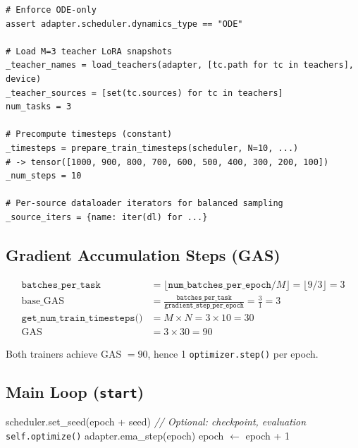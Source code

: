 \documentclass[11pt]{article}
\begin{document}
\begin{lstlisting}
# Enforce ODE-only
assert adapter.scheduler.dynamics_type == "ODE"

# Load M=3 teacher LoRA snapshots
_teacher_names = load_teachers(adapter, [tc.path for tc in teachers], device)
_teacher_sources = [set(tc.sources) for tc in teachers]
num_tasks = 3

# Precompute timesteps (constant)
_timesteps = prepare_train_timesteps(scheduler, N=10, ...)
# -> tensor([1000, 900, 800, 700, 600, 500, 400, 300, 200, 100])
_num_steps = 10

# Per-source dataloader iterators for balanced sampling
_source_iters = {name: iter(dl) for ...}
\end{lstlisting}

\subsection{Gradient Accumulation Steps (GAS)}

\begin{align}
\texttt{batches\_per\_task} &= \lfloor \texttt{num\_batches\_per\_epoch} / M \rfloor = \lfloor 9/3 \rfloor = 3 \\[6pt]
\text{base\_GAS} &= \frac{\texttt{batches\_per\_task}}{\texttt{gradient\_step\_per\_epoch}} = \frac{3}{1} = 3 \\[6pt]
\texttt{get\_num\_train\_timesteps()} &= M \times N = 3 \times 10 = 30 \\[6pt]
\text{GAS} &= 3 \times 30 = 90
\end{align}

Both trainers achieve GAS $= 90$, hence 1 \texttt{optimizer.step()} per epoch.

\subsection{Main Loop (\texttt{start})}

\begin{algorithm}[H]
\caption{DiffusionOPDTrainer.start()}
\begin{algorithmic}
    \STATE scheduler.set\_seed(epoch + seed)
    \STATE \textit{// Optional: checkpoint, evaluation}
    \STATE \texttt{self.optimize()} 
    \STATE adapter.ema\_step(epoch)
    \STATE epoch $\leftarrow$ epoch + 1
\ENDWHILE
\end{algorithmic}
\end{algorithm}
\end{document}
